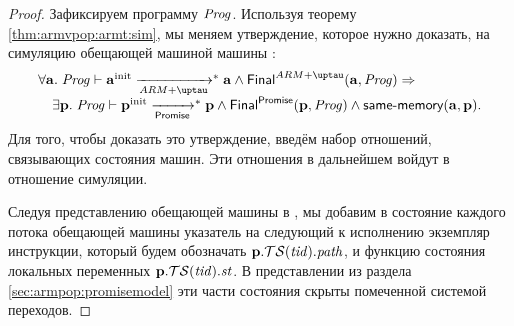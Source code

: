 \newcommand{\TSfprom}{\TSf}
\begin{proof}
  Зафиксируем программу $\mathit{Prog}$.
  Используя теорему \ref{thm:armvpop:armt:sim}, мы меняем утверждение, которое нужно
  доказать, на симуляцию обещающей машиной машины \ARMt:
\[\begin{array}{l}
  \forall \aT. \; \Cfprom \vdash \ainit \armStep^{*} \aT \land \finalStateA(\aT, \Cfarm) \Rightarrow \\
  \quad \exists \p. \; \Cfprom \vdash \pinit \promStep^{*} \p \land \finalStateProm(\p, \Cfprom) \land \sameMemory(\aT, \p). \\
\end{array}\]
Для того, чтобы доказать это утверждение, введём набор отношений, связывающих
состояния машин. Эти отношения в дальнейшем войдут в отношение симуляции.

Следуя представлению обещающей машины в \cite{Podkopaev-al:ECOOP17}, мы добавим в состояние
каждого потока обещающей машины указатель на следующий к исполнению экземпляр инструкции,
который будем обозначать $\mathbf{p}.\mathcal{TS}(\mathit{tid}).\mathit{path}$, и функцию состояния локальных
переменных $\mathbf{p}.\mathcal{TS}(\mathit{tid}).\mathit{st}$.
В представлении из раздела \ref{sec:armpop:promisemodel} эти части состояния скрыты
помеченной системой переходов.


\end{proof}
